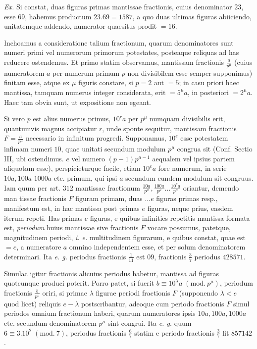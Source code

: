 \textit{Ex.} Si constat, duas figuras primas mantissae fractionis, cuius denominator \(23\), esse \(69\), habemus productum \(23.69=1587\), a quo duas ultimas figuras abiiciendo, unitatemque addendo, numerator quaesitus prodit \(=16\).

Inchoamus a consideratione talium fractionum, quarum denominatores sunt numeri primi vel numerorum primorum potestates, posteaque reliquas ad has reducere ostendemus. Et primo statim observamus, mantissam fractionis \(\frac a{p^\mu}\) (cuius numeratorem \(a\) per numerum primum \(p\) non divisibilem esse semper supponimus) finitam esse, atque ex \(\mu\) figuris constare, si \(p=2\) aut \(=5\); in casu priori haec mantissa, tamquam numerus integer considerata, erit \(=5^\mu a\), in posteriori \(=2^\mu a\). Haec tam obvia sunt, ut expositione non egeant.

Si vero \(p\) est alius numerus primus, \(10^r a\) per \(p^\mu\) numquam divisibilis erit, quantumvis magnus accipiatur \(r\), unde sponte sequitur, mantissam fractionis \(F=\frac a{p^\mu}\) necessario in infinitum progredi. Supponamus, \(10^e\) esse potestatem infimam numeri \(10\), quae unitati secundum modulum \(p^\mu\) congrua sit (Conf. Sectio III, ubi ostendimus. \(e\) vel numero \((p-1)p^{\mu-1}\) aequalem vel ipsius partem aliquotam esse), perspicieturque facile, etiam \(10^e a\) fore numerum, in serie \(10a,100a\) \(1000a\) etc. primum, qui ipsi \(a\) secundum eundem modulum sit congruus. Iam quum per art. \(312\) mantissae fractionum \(\frac{10a}{p^\mu},\frac{100a}{p^\mu}\ldots\frac{10^e a}{p^\mu}\) oriantur, demendo man%
tissae fractionis \(F\) figuram primam, duas \(\ldots e\) figuras primas resp., manifestum est, in hac mantissa post primas \(e\) figuras, neque prius, easdem iterum repeti. Has primas \(e\) figuras, e quibus infinities repetitis mantissa formata est, \textit{periodum} huius mantissae sive fractionis \(F\) vocare possumus, patetque, magnitudinem periodi, \textit{i. e.} multitudinem figurarum, e quibus constat, quae est \(=e\), a numeratore \(a\) omnino independentem esse, et per solum denominatorem determinari. Ita \textit{e. g.} periodus fractionis \(\frac1{11}\) est \(09\), fractionis \(\frac37\) periodus \(428571\).

Simulac igitur fractionis alicuius periodus habetur, mantissa ad figuras quotcunque produci poterit. Porro patet, si fuerit \(b\equiv10^\lambda a\; (\mathrm{mod}.\ p^\mu)\), periodum fractionis \(\frac b{p^\mu}\) oriri, si primae \(\lambda\) figurae periodi fractionis \(F\) (supponendo \(\lambda<e\) quod licet) reliquis \(e-\lambda\) postscribantur, adeoque cum periodo fractionis \(F\) simul periodos omnium fractionum haberi, quarum numeratores ipsis \(10a,100a,1000a\) etc. secundum denominatorem \(p^\mu\) sint congrui. Ita \textit{e. g.} quum \(6\equiv3.10^2\; (\mathrm{mod}.\ 7)\), periodus fractionis \(\frac67\) statim e periodo fractionis \(\frac37\) fit \(857142\).

